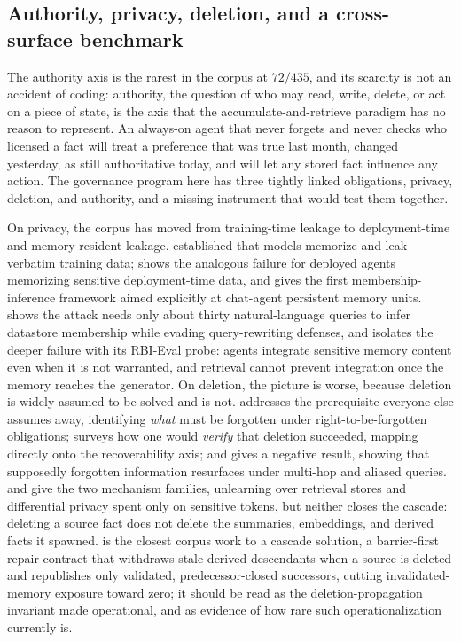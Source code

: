 \subsection{Authority, privacy, deletion, and a cross-surface benchmark}

The authority axis is the rarest in the corpus at $72/435$, and its scarcity is not
an accident of coding: authority, the question of who may read, write, delete, or
act on a piece of state, is the axis that the accumulate-and-retrieve paradigm has no
reason to represent. An always-on agent that never forgets and never checks who
licensed a fact will treat a preference that was true last month, changed yesterday,
as still authoritative today, and will let any stored fact influence any action. The
governance program here has three tightly linked obligations, privacy, deletion, and
authority, and a missing instrument that would test them together.

On privacy, the corpus has moved from training-time leakage to deployment-time and
memory-resident leakage. \citet{carlini2021extractingtrainingdata} established that
models memorize and leak verbatim training data; \citet{chen2026deploymenttimememorization}
shows the analogous failure for deployed agents memorizing sensitive deployment-time
data, and \citet{chen2026mrmmia} gives the first membership-inference framework aimed
explicitly at chat-agent persistent memory units. \citet{naseh2025riddle} shows the
attack needs only about thirty natural-language queries to infer datastore
membership while evading query-rewriting defenses, and \citet{xu2026memorysilent}
isolates the deeper failure with its RBI-Eval probe: agents integrate sensitive
memory content even when it is not warranted, and retrieval cannot prevent
integration once the memory reaches the generator. On deletion, the picture is
worse, because deletion is widely assumed to be solved and is not.
\citet{staufer2025whatshouldllmsforget} addresses the prerequisite everyone else
assumes away, identifying \emph{what} must be forgotten under right-to-be-forgotten
obligations; \citet{xue2025unlearningverificationsurvey} surveys how one would
\emph{verify} that deletion succeeded, mapping directly onto the recoverability axis;
and \citet{shah2026unlearningmirage} gives a negative result, showing
that supposedly forgotten information resurfaces under multi-hop and aliased queries.
\citet{wang2024unlearningmeetsrag} and \citet{koga2024dprag} give the two
mechanism families, unlearning over retrieval stores and differential privacy spent
only on sensitive tokens, but neither closes the cascade: deleting a source fact does
not delete the summaries, embeddings, and derived facts it spawned.
\citet{zhao2026memorepair} is the closest corpus work to a cascade solution, a
barrier-first repair contract that withdraws stale derived descendants when a source
is deleted and republishes only validated, predecessor-closed successors, cutting
invalidated-memory exposure toward zero; it should be read as the deletion-propagation
invariant made operational, and as evidence of how rare such operationalization
currently is.

